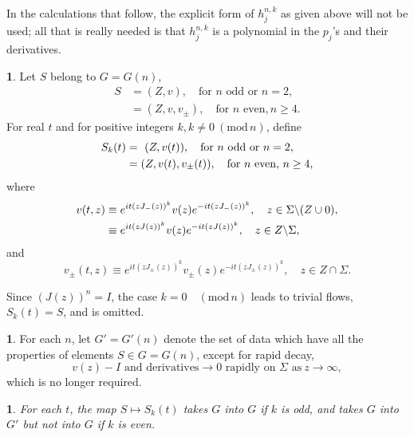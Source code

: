 \documentclass{surv-l}
\theoremstyle{plain}
\newtheorem{prop}[theorem]{\sc{Proposition}}
\theoremstyle{definition}
\newtheorem{definition}[theorem]{\sc{Definition}}
\numberwithin{equation}{chapter}
\begin{document}
In the calculations that follow, the explicit form of $h_{j}^{n,k}$ as given above will not be used; all that is really needed is that $h_{j}^{n,k}$ is a polynomial in the $p_{j}$'s and their derivatives.
\renewcommand\thetheorem{35.\arabic{theorem}}
\setcounter{theorem}{1}
\begin{definition}\label{defi35.2}
Let $S$ belong to $G=G(n)$,
\begin{align*}
S &=(Z, v),\quad \text{for } n\text{ odd or } n=2,\\
&=(Z, v, v_{\pm}),\quad \text{for } n \text{ even}, n\geq 4.
\end{align*}
For real $t$ and for positive integers $k, k\neq 0\ (\mathrm{mod}\, n)$, define
\setcounter{equation}{2}
\begin{align}\label{eq35.3}
S_{k}(t)&=\ (Z, v(t)),\quad \text{for } n \text{ odd or } n=2,\\
&= (Z, v(t), v_{\pm}(t)),\quad \text{for } n \text{ even},\, n\geq 4,\notag
\end{align}
where
\begin{align}\label{eq35.4}
v(t, z)&\equiv e^{it(zJ_{-}(z))^{k}}v(z)e^{-it(zJ_{-}(z))^{k}},\quad z\in\Sigma\backslash (Z\cup 0),\\
&\equiv e^{it(zJ(z))^{k}}v(z)e^{-it(zJ(z))^{k}},\quad z\in Z\backslash \Sigma,\notag
\end{align}
and
\begin{equation}\label{eq35.5}
v_{\pm}(t, z)\equiv e^{it(zJ_{\pm}(z))^{k}}v_{\pm}(z)e^{-it(zJ_{\pm}(z))^{k}},\quad  z\in Z\cap\Sigma.
\end{equation}

Since $(J(z))^{n}=I$, the case $k=0\quad(\mathrm{mod}\, n)$ leads to trivial flows, $S_{k}(t)=S$, and is omitted.
\end{definition}
\setcounter{theorem}{5}
\begin{definition}\label{defi35.6} For each $n$, let $G'=G'(n)$ denote the set of data which have all the properties of elements $S\in G=G(n)$, except for rapid decay,
\setcounter{equation}{6}
\begin{equation}\label{eq35.7}
v(z)-I \text{ and derivatives} \rightarrow 0\text{ rapidly on $\Sigma$ as}\ z\rightarrow\infty,
\end{equation}
which is no longer required.
\end{definition}
\setcounter{theorem}{7}
\begin{prop}\label{prop35.8}
For each $t$, the map $S\mapsto {S}_{k}(t)$ takes $G$ into $G$ if $k$ is odd, and takes $G$ into $G'$ but not into $G$ if $k$ is even.
\end{prop}
\end{document}
